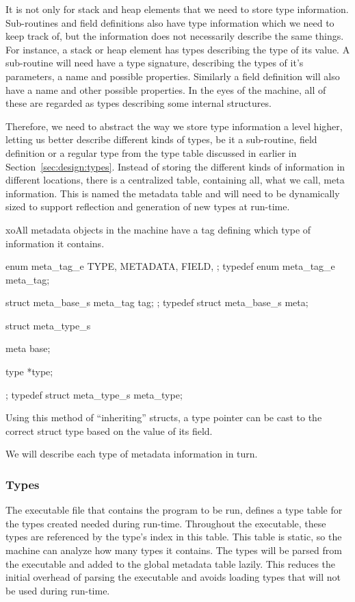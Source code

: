 It is not only for stack and heap elements that we need to store type
information. Sub-routines and field definitions also have type information which
we need to keep track of, but the information does not necessarily describe the
same things. For instance, a stack or heap element has types describing the type
of its value. A sub-routine will need have a type signature, describing the
types of it's parameters, a name and possible properties. Similarly a field
definition will also have a name and other possible properties. In the eyes of
the machine, all of these are regarded as types describing some internal
structures.

Therefore, we need to abstract the way we store type information a level higher,
letting us better describe different kinds of types, be it a sub-routine, field
definition or a regular type from the type table discussed in earlier in
Section~\ref{sec:design:types}. Instead of storing the different kinds of
information in different locations, there is a centralized table, containing
all, what we call, meta information. This is named the metadata table and will
need to be dynamically sized to support reflection and generation of new types
at run-time.

xoAll metadata objects in the machine have a tag defining which type of
information it contains.

\begin{ccode}
enum meta_tag_e {
    TYPE,
    METADATA,
    FIELD,
};
typedef enum meta_tag_e meta_tag;

struct meta_base_s {
    meta_tag tag;
};
typedef struct meta_base_s meta;

struct meta_type_s {
    meta base;

    type *type;
};
typedef struct meta_type_s meta_type;
\end{ccode}

Using this method of ``inheriting'' structs, a type pointer can be cast to the
correct struct type based on the value of its  field.

We will describe each type of metadata information in turn.

\subsubsection{Types}
\label{sec:implementation:meta:types}

The executable file that contains the program to be run, defines a type table
for the types created needed during run-time. Throughout the executable, these
types are referenced by the type's index in this table. This table is static, so
the machine can analyze how many types it contains. The types will be parsed
from the executable and added to the global metadata table lazily. This reduces
the initial overhead of parsing the executable and avoids loading types that
will not be used during run-time.


